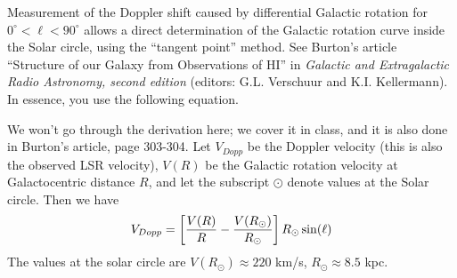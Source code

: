 \documentclass[preprint]{aastex}
\begin{document}
          Measurement of the Doppler shift caused by differential
Galactic rotation for $0^\circ < \ell < 90^\circ$ allows a direct
determination of the Galactic rotation curve inside the Solar circle,
using the ``tangent point'' method. See Burton's article ``Structure
of our Galaxy from Observations of HI'' in {\it Galactic and
Extragalactic Radio Astronomy, second edition} (editors: G.L. Verschuur
and K.I. Kellermann). In essence, you use the following equation.

	We won't go through the derivation here; we cover it in class,
and it is also done in Burton's article,
page 303-304.  Let $V_{Dopp}$ be the Doppler velocity (this is also the
observed LSR velocity), $V(R)$ be the Galactic rotation velocity at
Galactocentric distance $R$, and let the subscript $\odot$ denote values
at the Solar circle.  Then we have
\begin{equation} \label{vdopp}
V_{Dopp} = \left[ {V(R) \over R} - {V(R_\odot) \over R_\odot}\right]
R_\odot \sin(\ell)
\end{equation}
\noindent The values at the solar circle are $V(R_\odot) \approx 220$
km/s, $R_\odot \approx 8.5$ kpc.
\end{document}
